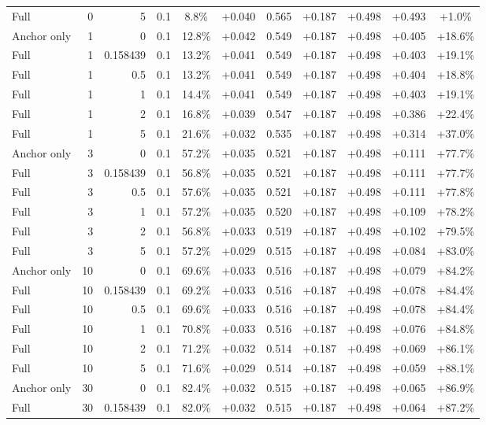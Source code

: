 \begin{table}[htbp]
\begin{tabular}{lrrrccccccc}
Full & 0 & 5 & 0.1 & 8.8\% & +0.040 & 0.565 & +0.187 & +0.498 & +0.493 & +1.0\% \\
Anchor only & 1 & 0 & 0.1 & 12.8\% & +0.042 & 0.549 & +0.187 & +0.498 & +0.405 & +18.6\% \\
Full & 1 & 0.158439 & 0.1 & 13.2\% & +0.041 & 0.549 & +0.187 & +0.498 & +0.403 & +19.1\% \\
Full & 1 & 0.5 & 0.1 & 13.2\% & +0.041 & 0.549 & +0.187 & +0.498 & +0.404 & +18.8\% \\
Full & 1 & 1 & 0.1 & 14.4\% & +0.041 & 0.549 & +0.187 & +0.498 & +0.403 & +19.1\% \\
Full & 1 & 2 & 0.1 & 16.8\% & +0.039 & 0.547 & +0.187 & +0.498 & +0.386 & +22.4\% \\
Full & 1 & 5 & 0.1 & 21.6\% & +0.032 & 0.535 & +0.187 & +0.498 & +0.314 & +37.0\% \\
Anchor only & 3 & 0 & 0.1 & 57.2\% & +0.035 & 0.521 & +0.187 & +0.498 & +0.111 & +77.7\% \\
Full & 3 & 0.158439 & 0.1 & 56.8\% & +0.035 & 0.521 & +0.187 & +0.498 & +0.111 & +77.7\% \\
Full & 3 & 0.5 & 0.1 & 57.6\% & +0.035 & 0.521 & +0.187 & +0.498 & +0.111 & +77.8\% \\
Full & 3 & 1 & 0.1 & 57.2\% & +0.035 & 0.520 & +0.187 & +0.498 & +0.109 & +78.2\% \\
Full & 3 & 2 & 0.1 & 56.8\% & +0.033 & 0.519 & +0.187 & +0.498 & +0.102 & +79.5\% \\
Full & 3 & 5 & 0.1 & 57.2\% & +0.029 & 0.515 & +0.187 & +0.498 & +0.084 & +83.0\% \\
Anchor only & 10 & 0 & 0.1 & 69.6\% & +0.033 & 0.516 & +0.187 & +0.498 & +0.079 & +84.2\% \\
Full & 10 & 0.158439 & 0.1 & 69.2\% & +0.033 & 0.516 & +0.187 & +0.498 & +0.078 & +84.4\% \\
Full & 10 & 0.5 & 0.1 & 69.6\% & +0.033 & 0.516 & +0.187 & +0.498 & +0.078 & +84.4\% \\
Full & 10 & 1 & 0.1 & 70.8\% & +0.033 & 0.516 & +0.187 & +0.498 & +0.076 & +84.8\% \\
Full & 10 & 2 & 0.1 & 71.2\% & +0.032 & 0.514 & +0.187 & +0.498 & +0.069 & +86.1\% \\
Full & 10 & 5 & 0.1 & 71.6\% & +0.029 & 0.514 & +0.187 & +0.498 & +0.059 & +88.1\% \\
Anchor only & 30 & 0 & 0.1 & 82.4\% & +0.032 & 0.515 & +0.187 & +0.498 & +0.065 & +86.9\% \\
Full & 30 & 0.158439 & 0.1 & 82.0\% & +0.032 & 0.515 & +0.187 & +0.498 & +0.064 & +87.2\% \\

\end{tabular}
\end{table}
